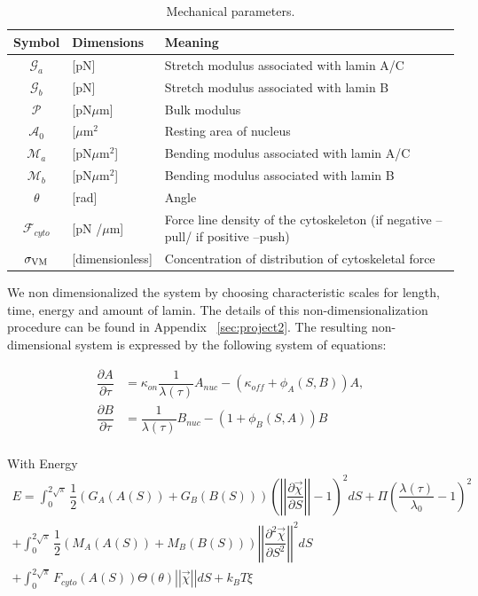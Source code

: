 \begin{table}[t!]
\caption{Mechanical parameters.}\centering \label{tab:nucmodelparameters} 
\begin{tabular}{ c  l  l}
\hline
Symbol & Dimensions & Meaning \\
\hline
$\mathcal{G}_a $ & [pN]  & Stretch modulus associated with lamin A/C \\
$\mathcal{G}_b$& [pN] & Stretch modulus associated with lamin B\\
$\mathcal{P}$ & [pN$\mu$m] & Bulk modulus \\
$\mathcal{A}_0$  & [$\mu$m$^2$ & Resting area of nucleus\\
$\mathcal{M}_a$ & [pN$\mu$m$^2$] &  Bending modulus associated with lamin A/C\\
$\mathcal{M}_b $ & [pN$\mu$m$^2$] &  Bending modulus associated with lamin B\\
$\theta$ &  [rad] & Angle \\
$\mathcal{F}_{cyto}$ & [pN /$\mu$m] & Force line density of the cytoskeleton (if negative --pull/ if positive --push)\\
$\sigma_{\rm VM}$ & [dimensionless] & Concentration of distribution of cytoskeletal force\\
\hline
\end{tabular}
\end{table}


We non dimensionalized the system by choosing characteristic scales for length, time, energy and amount of lamin. The details of this non-dimensionalization procedure can be found in Appendix ~\ref{sec:project2}. The resulting non-dimensional system is expressed by the following system of equations:

\begin{align}
\dfrac{\partial A}{\partial \tau} &= \kappa_{on}\dfrac{1}{\lambda (\tau)} A_{nuc}  - (\kappa_{off}+ \phi_A (S,B)) A,  \\[10pt]
\dfrac{\partial B}{\partial \tau} &= \dfrac{1}{\lambda (\tau)} B_{nuc}  - (1+ \phi_B (S,A)) B  \\[10pt]
\end{align}

With Energy 
\begin{align}
 E = \displaystyle \int_0^{2 \sqrt{\pi}} \dfrac{1}{2} (G_A(A(S))+ G_B(B(S)))\left( \left |\left|  \dfrac{\partial \vec{\chi} }{\partial S} \right|\right| - 1\right)^2  dS + \Pi \left(\dfrac{\lambda(\tau)}{\lambda_0} -1\right)^2\\[10pt]
 +\displaystyle\int_0^{2\sqrt{\pi}} \dfrac{1}{2 } (M_A(A(S))+ M_B(B(S)))\left|\left| \dfrac{\partial^2 \vec{\chi}}{\partial S^2} \right|\right|^2 dS\\[10pt]
+ \displaystyle\int_0^{2\sqrt{\pi}} F_{cyto}(A(S))\Theta (\theta) \left|\left| \vec{\chi} \right|\right| dS +k_BT \xi
\end{align}

